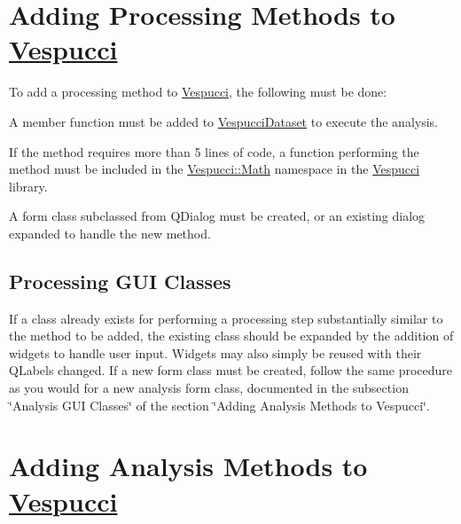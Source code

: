 \section*{Adding Processing Methods to \hyperlink{namespace_vespucci}{Vespucci} }

To add a processing method to \hyperlink{namespace_vespucci}{Vespucci}, the following must be done\+:
\begin{DoxyItemize}
\item A member function must be added to {\ttfamily \hyperlink{class_vespucci_dataset}{Vespucci\+Dataset}} to execute the analysis.
\item If the method requires more than 5 lines of code, a function performing the method must be included in the {\ttfamily \hyperlink{namespace_vespucci_1_1_math}{Vespucci\+::\+Math}} namespace in the \hyperlink{namespace_vespucci}{Vespucci} library.
\item A form class subclassed from {\ttfamily Q\+Dialog} must be created, or an existing dialog expanded to handle the new method.
\end{DoxyItemize}

\subsection*{Processing G\+UI Classes }

If a class already exists for performing a processing step substantially similar to the method to be added, the existing class should be expanded by the addition of widgets to handle user input. Widgets may also simply be reused with their {\ttfamily Q\+Label}s changed. If a new form class must be created, follow the same procedure as you would for a new analysis form class, documented in the subsection \char`\"{}\+Analysis G\+U\+I Classes\char`\"{} of the section \char`\"{}\+Adding Analysis Methods to Vespucci\char`\"{}.

\section*{Adding Analysis Methods to \hyperlink{namespace_vespucci}{Vespucci} }


